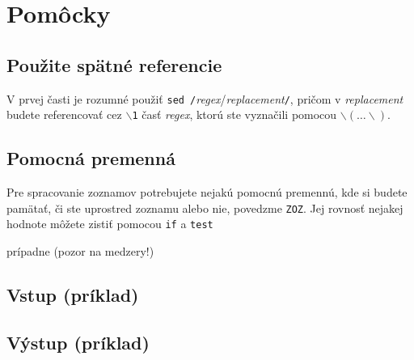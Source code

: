 \documentclass{article}
\newcommand{\codefile}[1]{\begin{framed}\end{framed}}
\newcommand{\codefilenoframedsmall}[1]{{\small}}
\newcommand{\codefilenoframedtiny}[1]{{\tiny}}
\begin{document}
\section{Pomôcky}

\subsection{Použite spätné referencie}

V prvej časti je rozumné použiť {\tt sed /}{\it regex}/{\it replacement}{\tt /}, pričom v {\it replacement} budete referencovať cez {\tt $\backslash$1} časť {\it regex}, ktorú ste vyznačili pomocou $\backslash(\dots\backslash)$.

\subsection{Pomocná premenná}
Pre spracovanie zoznamov potrebujete nejakú pomocnú premennú, kde si budete
pamätať, či ste uprostred zoznamu alebo nie, povedzme {\tt ZOZ}. Jej rovnosť
nejakej hodnote môžete zistiť pomocou {\tt if} a {\tt test}
\codefile{iftest.sh}
prípadne (pozor na medzery!)
\codefile{ifbra.sh}
\newpage
\subsection{Vstup (príklad)}
\codefilenoframedsmall{example.md}
\newpage
\subsection{Výstup (príklad)}
\codefilenoframedtiny{example.html}
\end{document}
